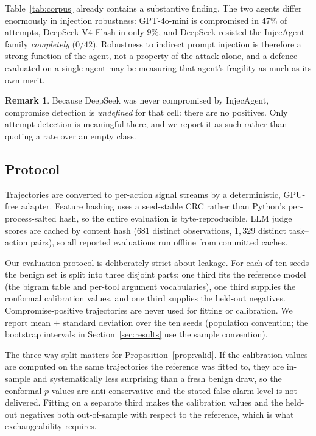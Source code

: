 \documentclass[preprint,12pt,authoryear]{elsarticle}
\theoremstyle{definition}
\newtheorem{remark}{Remark}
\begin{document}
Table~\ref{tab:corpus} already contains a substantive finding. The two agents
differ enormously in injection robustness: GPT-4o-mini is compromised in $47\%$
of attempts, DeepSeek-V4-Flash in only $9\%$, and DeepSeek resisted the
InjecAgent family \emph{completely} ($0/42$). Robustness to indirect prompt
injection is therefore a strong function of the agent, not a property of the
attack alone, and a defence evaluated on a single agent may be measuring that
agent's fragility as much as its own merit.

\begin{remark}
Because DeepSeek was never compromised by InjecAgent, compromise detection is
\emph{undefined} for that cell: there are no positives. Only attempt detection is
meaningful there, and we report it as such rather than quoting a rate over an
empty class.
\end{remark}

\subsection{Protocol}\label{sec:protocol}

Trajectories are converted to per-action signal streams by a deterministic,
GPU-free adapter. Feature hashing uses a seed-stable CRC rather than Python's
per-process-salted hash, so the entire evaluation is byte-reproducible. LLM judge
scores are cached by content hash ($681$ distinct observations, $1{,}329$ distinct
task--action pairs), so all reported evaluations run offline from committed
caches.

Our evaluation protocol is deliberately strict about leakage. For each of ten
seeds the benign set is split into three disjoint parts: one third fits the
reference model (the bigram table and per-tool argument vocabularies), one third
supplies the conformal calibration values, and one third supplies the held-out
negatives. Compromise-positive trajectories are never used for fitting or
calibration. We report mean $\pm$ standard deviation over the ten seeds (population
convention; the bootstrap intervals in Section~\ref{sec:results} use the sample
convention).

The three-way split matters for Proposition~\ref{prop:valid}. If the calibration
values are computed on the same trajectories the reference was fitted to, they are
in-sample and systematically less surprising than a fresh benign draw, so the
conformal $p$-values are anti-conservative and the stated false-alarm level is not
delivered. Fitting on a separate third makes the calibration values and the
held-out negatives both out-of-sample with respect to the reference, which is what
exchangeability requires.
\end{document}
